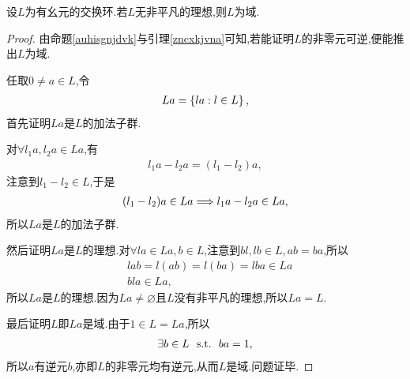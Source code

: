 \begin{problem}[P57T35]
    设$L$为有幺元的交换环.若$L$无非平凡的理想,则$L$为域.
\end{problem}
\begin{proof}
    由命题\ref{auhisgnjdvk}与引理\ref{zncxkjvna}可知,若能证明$L$的非零元可逆,便能推出$L$为域.

    任取$0\neq a\in L$,令\begin{align*}
        La=\left\{la:l\in L\right\},
    \end{align*}首先证明$La$是$L$的加法子群.

    对$\forall l_1a,l_2a\in La$,有\begin{align*}
        l_1a-l_2a=(l_1-l_2)a,
    \end{align*}注意到$l_1-l_2\in L$,于是\begin{align*}
        (l_1-l_2)a\in La\Longrightarrow l_1a-l_2a\in La,
    \end{align*}所以$La$是$L$的加法子群.

    然后证明$La$是$L$的理想.对$\forall la\in La,b\in L$,注意到$bl,lb\in L,ab=ba$,所以\begin{align*}
        &lab=l(ab)=l(ba)=lba\in La\\
        &bla\in La,
    \end{align*}所以$La$是$L$的理想.因为$La\neq\varnothing$且$L$没有非平凡的理想,所以$La=L$.

    最后证明$L$即$La$是域.由于$1\in L=La$,所以\begin{align*}
        \exists b\in L\ \ \mathrm{s.t.}\ \  ba=1,
    \end{align*}所以$a$有逆元$b$,亦即$L$的非零元均有逆元,从而$L$是域.问题证毕.
\end{proof}